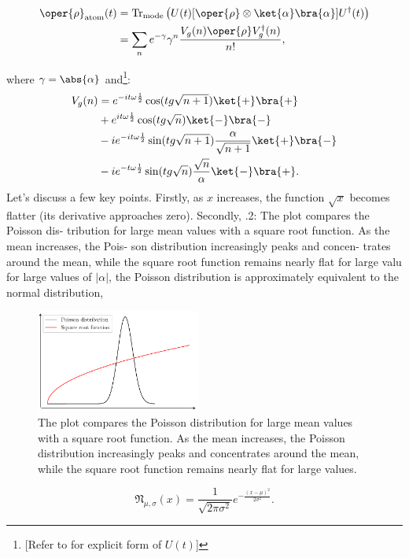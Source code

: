 \begin{align}
\oper{\rho}_{\text{atom}}(t) &= 
\text{Tr}_{\text{mode}} \left( U(t)[\oper{\rho} \otimes \ket{\alpha}\bra{\alpha}]U^\dagger(t) \right) \nonumber \\
 &= \sum_n e^{-\gamma} \gamma^n \frac{V_g(n)\oper{\rho} V_g^\dagger(n)}{n!},
\end{align}

where \(\gamma = \abs{\alpha}\) and\footnote{[Refer to  for explicit form of \(U(t)\)]}:
\begin{align}
        \label{eq:appen_JCM_V_g}
    V_g (n) &=e^{-it\omega\frac{1}{2}}  \cos(tg\sqrt{n + 1})\ket{+}\bra{+}\\
&+ e^{it\omega\frac{1}{2}} \cos(tg\sqrt{n})\ket{-}\bra{-}\\
&- ie^{-it\omega\frac{1}{2}} \sin(tg\sqrt{n + 1}) \frac{\alpha}{\sqrt{n + 1}} \ket{+}\bra{-}\\
&- ie^{-t\omega\frac{1}{2}} \sin(tg\sqrt{n}) \frac{\sqrt{n}}{\alpha} \ket{-}\bra{+}.
\end{align}
Let's discuss a few key points. Firstly, as \( x \) increases, the function 
\( \sqrt{x} \) becomes flatter (its derivative approaches zero). Secondly, .2: The plot compares the Poisson dis-
tribution for large mean values with a square
root function. As the mean increases, the Pois-
son distribution increasingly peaks and concen-
trates around the mean, while the square root
function remains nearly flat for large valu
for large values of \( |\alpha| \), the Poisson distribution is approximately 
equivalent to the normal distribution, \begin{figure}
  \centering
  \includegraphics[width=0.48\textwidth]{figures/chap5/poisson_distribution.pdf}
  \caption{The plot compares the Poisson distribution for large mean values with a square root function. As the mean increases, the Poisson distribution increasingly peaks and concentrates around the mean, while the square root function remains nearly flat for large values. }
\end{figure}
\begin{equation}
\mathfrak{N}_{\mu, \sigma}(x) = \frac{1}{\sqrt{2\pi\sigma^2}} e^{-\frac{(x-\mu)^2}{2\sigma^2}}.
\end{equation}

